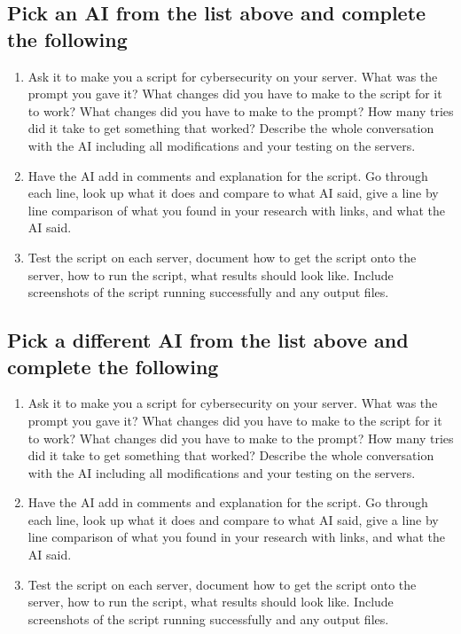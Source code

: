 \documentclass[12pt]{article}
\begin{document}
\subsection*{Pick an AI from the list above and complete the following}
\begin{enumerate}
    \item Ask it to make you a script for cybersecurity on your server. What was the prompt you gave it? What changes did you have to make to the script for it to work? What changes did you have to make to the prompt? How many tries did it take to get something that worked? Describe the whole conversation with the AI including all modifications and your testing on the servers.
    \item Have the AI add in comments and explanation for the script.  Go through each line, look up what it does and compare to what AI said, give a line by line comparison of what you found in your research with links, and what the AI said. 
    \item Test the script on each server, document how to get the script onto the server, how to run the script, what results should look like.  Include screenshots of the script running successfully and any output files. 
    \end{enumerate}

    \subsection*{Pick a different AI from the list above and complete the following}
\begin{enumerate}
    \item Ask it to make you a script for cybersecurity on your server. What was the prompt you gave it? What changes did you have to make to the script for it to work? What changes did you have to make to the prompt? How many tries did it take to get something that worked? Describe the whole conversation with the AI including all modifications and your testing on the servers.
    \item Have the AI add in comments and explanation for the script.  Go through each line, look up what it does and compare to what AI said, give a line by line comparison of what you found in your research with links, and what the AI said. 
    \item Test the script on each server, document how to get the script onto the server, how to run the script, what results should look like.  Include screenshots of the script running successfully and any output files. 
    \end{enumerate}
\end{document}
